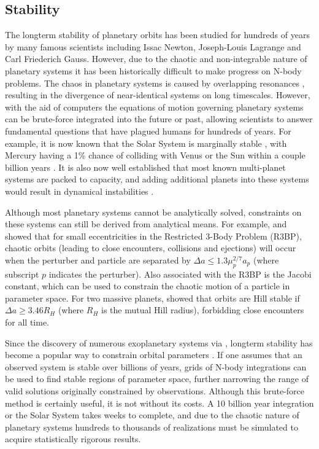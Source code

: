 \subsection{Stability}
\label{sec:stability}
The longterm stability of planetary orbits has been studied for hundreds of years by many famous scientists including Issac Newton, Joseph-Louis Lagrange and Carl Friederich Gauss. 
However, due to the chaotic and non-integrable nature of planetary systems it has been historically difficult to make progress on N-body problems.  
The chaos in planetary systems is caused by overlapping resonances \citep{Chirikov1979, Lecar2001}, resulting in the divergence of near-identical systems on long timescales. 
However, with the aid of computers the equations of motion governing planetary systems can be brute-force integrated into the future or past, allowing scientists to answer fundamental questions that have plagued humans for hundreds of years. 
For example, it is now known that the Solar System is marginally stable \citep{Sussman1988, Laskar1994, Lecar2001}, with Mercury having a 1\% chance of colliding with Venus or the Sun within a couple billion years \citep{Laskar2009}.
It is also now well established that most known multi-planet systems are packed to capacity, and adding additional planets into these systems would result in dynamical instabilities \citep{Fang2013,Pu2015}.

Although most planetary systems cannot be analytically solved, constraints on these systems can still be derived from analytical means.
For example, \citet{Wisdom1980} and \citet{Duncan1989} showed that for small eccentricities in the Restricted 3-Body Problem (R3BP), chaotic orbits (leading to close encounters, collisions and ejections) will occur when the perturber and particle are separated by $\Delta a \le 1.3\mu_p^{2/7}a_p$ (where subscript $p$ indicates the perturber). 
Also associated with the R3BP is the Jacobi constant, which can be used to constrain the chaotic motion of a particle in parameter space. 
For two massive planets, \citet{Gladman1993} showed that orbits are Hill stable if $\Delta a \ge 3.46 R_H$ (where $R_H$ is the mutual Hill radius), forbidding close encounters for all time.

Since the discovery of numerous exoplanetary systems via \kep, longterm stability has become a popular way to constrain orbital parameters \citep{Lissauer2011, Steffen2013, Jontof-Hutter2014, Tamayo2015}. 
If one assumes that an observed system is stable over billions of years, grids of N-body integrations can be used to find stable regions of parameter space, further narrowing the range of valid solutions originally constrained by observations. 
Although this brute-force method is certainly useful, it is not without its costs. 
A 10 billion year integration or the Solar System takes weeks to complete, and due to the chaotic nature of planetary systems hundreds to thousands of realizations must be simulated to acquire statistically rigorous results. 

